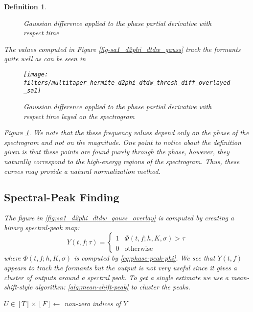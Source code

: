 \documentclass[english]{article}
\newtheorem{defn}{Definition}[section]
\begin{document}
\begin{defn}
\begin{figure}
\caption{Gaussian difference applied to the phase partial derivative with respect
time}
\end{figure}
The values computed in Figure \ref{fig-sa1_d2phi_dtdw_gauss} track
the formants quite well as can be seen in 
\begin{figure}
\begin{centering}
\label{fig:sa1_d2phi_dtdw_gauss_overlay}\texttt{[image: filters/multitaper\_hermite\_d2phi\_dtdw\_thresh\_diff\_overlayed\_sa1]}
\par\end{centering}

\caption{Gaussian difference applied to the phase partial derivative with respect
time layed on the spectrogram}
\end{figure}
 Figure \ref{fig:sa1_d2phi_dtdw_gauss_overlay}. We note that the
these frequency values depend only on the phase of the spectrogram
and not on the magnitude. One point to notice about the definition
given is that these points are found purely through the phase, however,
they naturally correspond to the high-energy regions of the spectrogram.
Thus, these curves may provide a natural normalization method.

\subsection{Spectral-Peak Finding}
\label{sec:spectral-peak-finding}
The figure in 
\autoref{fig:sa1_d2phi_dtdw_gauss_overlay} is computed by creating a binary spectral-peak map:
\begin{equation}
Y(t,f; \tau) =\begin{cases}
1 & \Phi(t,f;h,K,\sigma) > \tau\\
0 & \text{otherwise}
\end{cases}
\end{equation}
where $\Phi(t,f;h,K,\sigma)$ is computed by \autoref{eq:phase-peak-phi}.  We see that $Y(t,f)$ 
appears to track the formants but the output is not very useful since it 
gives a cluster of outputs around a spectral peak.  To get a single estimate we use a mean-shift-style
algorithm: \autoref{alg:mean-shift-peak} to cluster the peaks.
\begin{algorithm}[t]
\SetAlgoNoLine
{}
  $U\in [T]\times [F]\leftarrow $ non-zero indices of $Y$\;


\end{algorithm}
\end{defn}
\end{document}
